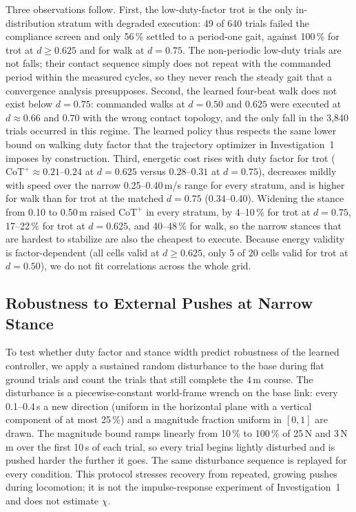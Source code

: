 Three observations follow. First, the low-duty-factor trot is the only
in-distribution stratum with degraded execution: 49 of 640 trials failed the
compliance screen and only 56\,\% settled to a period-one gait, against
100\,\% for trot at $d\geq0.625$ and for walk at $d=0.75$. The non-periodic
low-duty trials are not falls; their contact sequence simply does not repeat
with the commanded period within the measured cycles, so they never reach the
steady gait that a convergence analysis presupposes. Second, the learned
four-beat walk does not exist below $d=0.75$: commanded walks at $d=0.50$ and
$0.625$ were executed at $d\approx0.66$ and $0.70$ with the wrong contact
topology, and the only fall in the 3{,}840 trials occurred in this regime.
The learned policy thus respects the same lower bound on walking duty factor
that the trajectory optimizer in Investigation~1 imposes by construction.
Third, energetic cost rises with duty factor for trot
($\mathrm{CoT}^{+}\approx0.21$--$0.24$ at $d=0.625$ versus $0.28$--$0.31$ at
$d=0.75$), decreases mildly with speed over the narrow 0.25--0.40\,m/s range
for every stratum, and is higher for walk than for trot at the matched
$d=0.75$ ($0.34$--$0.40$). Widening the stance from 0.10 to 0.50\,m raised
$\mathrm{CoT}^{+}$ in every stratum, by 4--10\,\% for trot at $d=0.75$,
17--22\,\% for trot at $d=0.625$, and 40--48\,\% for walk, so the narrow
stances that are hardest to stabilize are also the cheapest to execute.
Because energy validity is factor-dependent (all cells valid at $d\ge0.625$,
only 5 of 20 cells valid for trot at $d=0.50$), we do not fit correlations
across the whole grid.

\subsection{Robustness to External Pushes at Narrow Stance}
\label{sec:inv3_push}

To test whether duty factor and stance width predict robustness of the learned
controller, we apply a sustained random disturbance to the base during flat
ground trials and count the trials that still complete the 4\,m course. The
disturbance is a piecewise-constant world-frame wrench on the base link:
every 0.1--0.4\,s a new direction (uniform in the horizontal plane with a
vertical component of at most 25\,\%) and a magnitude fraction uniform in
$[0,1]$ are drawn. The magnitude bound ramps linearly from 10\,\% to 100\,\% of
25\,N and 3\,N\,m over the first 10\,s of each trial, so every trial begins
lightly disturbed and is pushed harder the further it goes. The same
disturbance sequence is replayed for every condition. This protocol stresses
recovery from repeated, growing pushes during locomotion; it is not the
impulse-response experiment of Investigation~1 and does not estimate
$\chi$.

